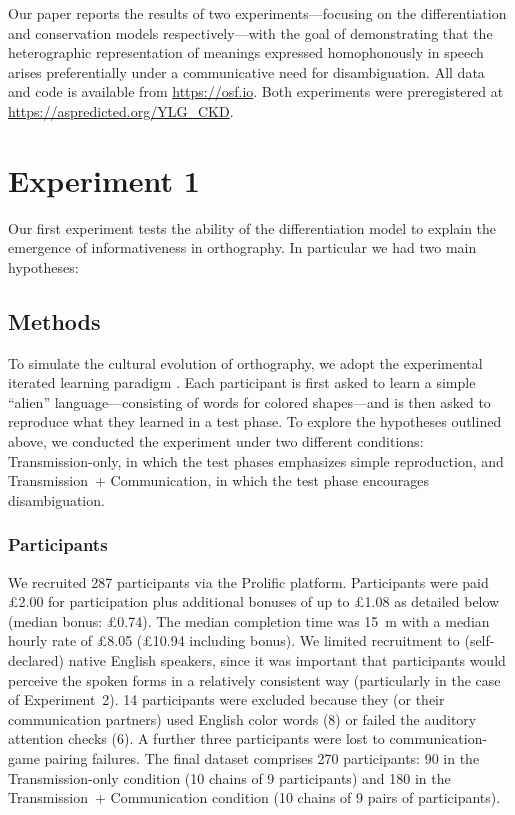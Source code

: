 \documentclass[doc,biblatex]{apa7}
\begin{document}
Our paper reports the results of two experiments---focusing on the differentiation and conservation models respectively---with the goal of demonstrating that the heterographic representation of meanings expressed homophonously in speech arises preferentially under a communicative need for disambiguation. All data and code is available from \url{https://osf.io}. Both experiments were preregistered at \url{https://aspredicted.org/YLG_CKD}.


\section{Experiment 1}

Our first experiment tests the ability of the differentiation model to explain the emergence of informativeness in orthography. In particular we had two main hypotheses:

\subsection{Methods}

To simulate the cultural evolution of orthography, we adopt the experimental iterated learning paradigm \parencite{Kirby:2008, Kirby:2015}. Each participant is first asked to learn a simple ``alien'' language---consisting of words for colored shapes---and is then asked to reproduce what they learned in a test phase. To explore the hypotheses outlined above, we conducted the experiment under two different conditions: Transmission-only, in which the test phases emphasizes simple reproduction, and Transmission~+ Communication, in which the test phase encourages disambiguation.

\subsubsection{Participants}

We recruited 287 participants via the Prolific platform. Participants were paid £2.00 for participation plus additional bonuses of up to £1.08 as detailed below (median bonus: £0.74). The median completion time was 15~m with a median hourly rate of £8.05 (£10.94 including bonus). We limited recruitment to (self-declared) native English speakers, since it was important that participants would perceive the spoken forms in a relatively consistent way (particularly in the case of Experiment~2). 14 participants were excluded because they (or their communication partners) used English color words (8) or failed the auditory attention checks (6). A further three participants were lost to communication-game pairing failures. The final dataset comprises 270 participants: 90 in the Transmission-only condition (10 chains of 9 participants) and 180 in the Transmission~+ Communication condition (10 chains of 9 pairs of participants).
\end{document}
